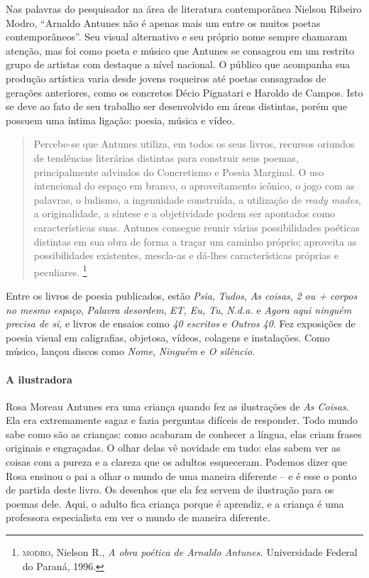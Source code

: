 \documentclass[11pt]{extarticle}
\begin{document}
Nas palavras do pesquisador na área de literatura contemporânea Nielson Ribeiro Modro, 
``Arnaldo Antunes não é apenas mais um entre os muitos poetas contemporâneos''.
Seu visual alternativo e seu próprio nome sempre chamaram atenção, mas foi como poeta 
e músico que Antunes se consagrou em um
restrito grupo de artistas com destaque a nível nacional. O público que acompanha sua
produção artística varia desde jovens roqueiros até poetas consagrados de gerações anteriores, como os concretos Décio
Pignatari e Haroldo de Campos. Isto se deve ao fato de seu trabalho ser desenvolvido em
áreas distintas, porém que possuem uma íntima ligação: poesia, música e vídeo.

\begin{quote}
Percebe-se que Antunes
utiliza, em todos os seus livros, recursos oriundos de tendências literárias distintas para
construir seus poemas, principalmente advindos do Concretismo e Poesia Marginal. O uso
intencional do espaço em branco, o aproveitamento icônico, o jogo com as palavras, o
ludismo, a ingenuidade construída, a utilização de \textit{ready mades}, a originalidade, a síntese e
a objetividade podem ser apontados como características suas. Antunes consegue reunir
várias possibilidades poéticas distintas em sua obra de forma a traçar um caminho próprio;
aproveita as possibilidades existentes, mescla-as e dá-lhes características próprias e
peculiares. \footnote{\textsc{modro}, Nielson R., \textit{A obra poética de Arnaldo Antunes.} Universidade Federal do Paraná, 1996.}
\end{quote}


Entre os livros de poesia publicados, estão \emph{Psia}, \emph{Tudos}, 
\emph{As coisas}, \emph{2 ou + corpos no mesmo espaço}, \emph{Palavra desordem}, 
\emph{ET, Eu, Tu}, \emph{N.d.a.} e \emph{Agora aqui ninguém precisa de si}, 
e livros de ensaios como \emph{40 escritos} e \emph{Outros 40}.  
Fez exposições de poesia visual em caligrafias, objetosa, vídeos, colagens e instalações. 
Como músico, lançou discos como \emph{Nome}, \emph{Ninguém} e \emph{O silêncio}.

\paragraph{A ilustradora}

Rosa Moreau Antunes era uma criança quando fez as ilustrações de \textit{As Coisas}. Ela era extremamente sagaz e fazia perguntas difíceis de responder. Todo mundo sabe como são as crianças: como acabaram de conhecer a língua, elas criam frases originais e engraçadas. O olhar delas vê novidade em tudo: elas sabem ver as coisas com a pureza e a clareza que os adultos esqueceram. Podemos dizer que Rosa ensinou o pai a olhar o mundo de uma maneira diferente -- e é esse o ponto de partida deste livro. Os desenhos que ela fez servem de ilustração para os poemas dele. Aqui, o adulto fica criança porque é aprendiz, e a criança é uma professora especialista em ver o mundo de maneira diferente.   
\end{document}
